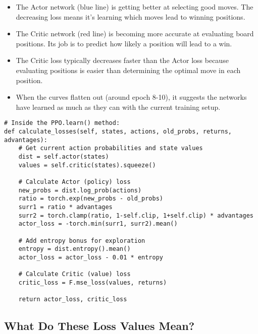 \documentclass[11pt]{article}
\begin{document}
\begin{itemize}
    \item The Actor network (blue line) is getting better at selecting good moves. The decreasing loss means it's learning which moves lead to winning positions.
    
    \item The Critic network (red line) is becoming more accurate at evaluating board positions. Its job is to predict how likely a position will lead to a win.
    
    \item The Critic loss typically decreases faster than the Actor loss because evaluating positions is easier than determining the optimal move in each position.
    
    \item When the curves flatten out (around epoch 8-10), it suggests the networks have learned as much as they can with the current training setup.
\end{itemize}

\begin{tcolorbox}[colback=green!5!white,colframe=green!75!black,title=Code Example: Calculating Loss Values]
\begin{verbatim}
# Inside the PPO.learn() method:
def calculate_losses(self, states, actions, old_probs, returns, advantages):
    # Get current action probabilities and state values
    dist = self.actor(states)
    values = self.critic(states).squeeze()
    
    # Calculate Actor (policy) loss
    new_probs = dist.log_prob(actions)
    ratio = torch.exp(new_probs - old_probs)
    surr1 = ratio * advantages
    surr2 = torch.clamp(ratio, 1-self.clip, 1+self.clip) * advantages
    actor_loss = -torch.min(surr1, surr2).mean()
    
    # Add entropy bonus for exploration
    entropy = dist.entropy().mean()
    actor_loss = actor_loss - 0.01 * entropy
    
    # Calculate Critic (value) loss
    critic_loss = F.mse_loss(values, returns)
    
    return actor_loss, critic_loss
\end{verbatim}
\end{tcolorbox}

\subsection{What Do These Loss Values Mean?}
\end{document}
